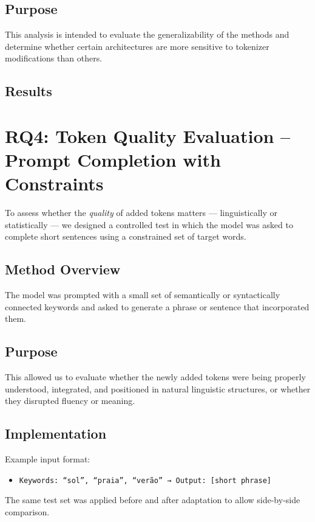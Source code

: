 \subsection{Purpose}
This analysis is intended to evaluate the generalizability of the methods and determine whether certain architectures are more sensitive to tokenizer modifications than others.

\subsection{Results}

\section{RQ4: Token Quality Evaluation – Prompt Completion with Constraints}
\label{sec:token_quality_test}

To assess whether the \textit{quality} of added tokens matters — linguistically or statistically — we designed a controlled test in which the model was asked to complete short sentences using a constrained set of target words.

\subsection{Method Overview}
The model was prompted with a small set of semantically or syntactically connected keywords and asked to generate a phrase or sentence that incorporated them.

\subsection{Purpose}
This allowed us to evaluate whether the newly added tokens were being properly understood, integrated, and positioned in natural linguistic structures, or whether they disrupted fluency or meaning.

\subsection{Implementation}
Example input format:
\begin{itemize}
    \item \texttt{Keywords: “sol”, “praia”, “verão” → Output: [short phrase]}
\end{itemize}

The same test set was applied before and after adaptation to allow side-by-side comparison.

